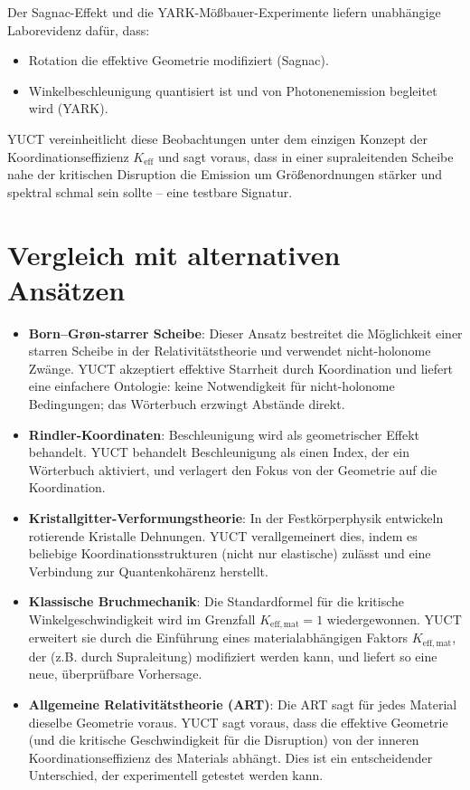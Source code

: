 \documentclass[12pt,a4paper]{article}
\begin{document}
	Der Sagnac-Effekt und die YARK-Mößbauer-Experimente liefern unabhängige Laborevidenz dafür, dass:
	\begin{itemize}
		\item Rotation die effektive Geometrie modifiziert (Sagnac).
		\item Winkelbeschleunigung quantisiert ist und von Photonenemission begleitet wird (YARK).
	\end{itemize}
	YUCT vereinheitlicht diese Beobachtungen unter dem einzigen Konzept der Koordinationseffizienz \(K_{\mathrm{eff}}\) und sagt voraus, dass in einer supraleitenden Scheibe nahe der kritischen Disruption die Emission um Größenordnungen stärker und spektral schmal sein sollte – eine testbare Signatur.
	
	\section{Vergleich mit alternativen Ansätzen}
	\label{sec:comparison}
	
	\begin{itemize}
		\item \textbf{Born–Gr{\o}n-starrer Scheibe}: Dieser Ansatz bestreitet die Möglichkeit einer starren Scheibe in der Relativitätstheorie und verwendet nicht-holonome Zwänge. YUCT akzeptiert effektive Starrheit durch Koordination und liefert eine einfachere Ontologie: keine Notwendigkeit für nicht-holonome Bedingungen; das Wörterbuch erzwingt Abstände direkt.
		\item \textbf{Rindler-Koordinaten}: Beschleunigung wird als geometrischer Effekt behandelt. YUCT behandelt Beschleunigung als einen Index, der ein Wörterbuch aktiviert, und verlagert den Fokus von der Geometrie auf die Koordination.
		\item \textbf{Kristallgitter-Verformungstheorie}: In der Festkörperphysik entwickeln rotierende Kristalle Dehnungen. YUCT verallgemeinert dies, indem es beliebige Koordinationsstrukturen (nicht nur elastische) zulässt und eine Verbindung zur Quantenkohärenz herstellt.
		\item \textbf{Klassische Bruchmechanik}: Die Standardformel für die kritische Winkelgeschwindigkeit wird im Grenzfall \(K_{\mathrm{eff,mat}} = 1\) wiedergewonnen. YUCT erweitert sie durch die Einführung eines materialabhängigen Faktors \(K_{\mathrm{eff,mat}}\), der (z.B. durch Supraleitung) modifiziert werden kann, und liefert so eine neue, überprüfbare Vorhersage.
		\item \textbf{Allgemeine Relativitätstheorie (ART)}: Die ART sagt für jedes Material dieselbe Geometrie voraus. YUCT sagt voraus, dass die effektive Geometrie (und die kritische Geschwindigkeit für die Disruption) von der inneren Koordinationseffizienz des Materials abhängt. Dies ist ein entscheidender Unterschied, der experimentell getestet werden kann.
	\end{itemize}
	
\end{document}
